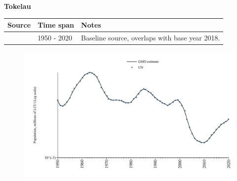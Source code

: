 \documentclass[12pt,a4paper,landscape]{article}
\begin{document}
\begin{adjustbox}{max totalsize={\paperwidth}{\paperheight},center}
\begin{minipage}[t][\textheight][t]{\textwidth}
\vspace*{0.5cm}
{}
\begin{center}
{\Large\bfseries Tokelau}
\end{center}
\vspace{0.5cm}
\begin{table}[H]
\centering
\small
\begin{tabular}{|l|l|l|}
\hline
\textbf{Source} & \textbf{Time span} & \textbf{Notes} \\
\hline
\rowcolor{white}\cite{UN}& 1950 - 2020 &Baseline source, overlaps with base year 2018.\\
\hline
\end{tabular}
\end{table}
\begin{figure}[H]
\centering
\includegraphics[width=\textwidth,height=0.6\textheight,keepaspectratio]{graphs/TKL_pop.pdf}
\end{figure}
\end{minipage}
\end{adjustbox}
\end{document}
